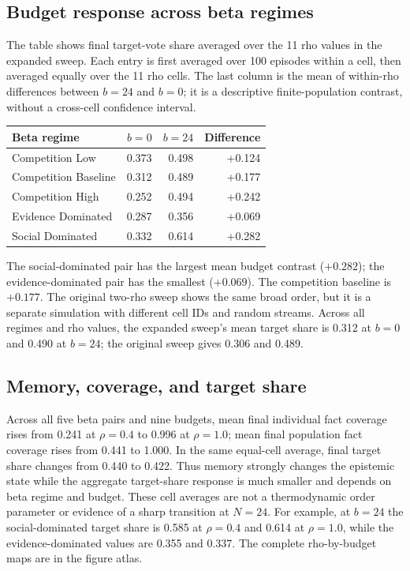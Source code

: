 \documentclass[10pt,a4paper]{article}
\begin{document}
\subsection{Budget response across beta regimes}
The table shows final target-vote share averaged over the 11 rho values in the
expanded sweep. Each entry is first averaged over 100 episodes within a
cell, then averaged equally over the 11 rho cells. The last column is the
mean of within-rho differences between $b=24$ and $b=0$; it is a descriptive
finite-population contrast, without a cross-cell confidence interval.
\begin{center}\begin{tabular}{lrrr}\toprule
Beta regime & $b=0$ & $b=24$ & Difference\\\midrule
Competition Low & 0.373 & 0.498 & +0.124\\
Competition Baseline & 0.312 & 0.489 & +0.177\\
Competition High & 0.252 & 0.494 & +0.242\\
Evidence Dominated & 0.287 & 0.356 & +0.069\\
Social Dominated & 0.332 & 0.614 & +0.282\\
\bottomrule\end{tabular}\end{center}
The social-dominated pair has the largest mean budget contrast ($+0.282$);
the evidence-dominated pair has the smallest ($+0.069$). The competition
baseline is $+0.177$. The original two-rho sweep shows the same broad order,
but it is a separate simulation with different cell IDs and random streams.
Across all regimes and rho values, the expanded sweep's mean target share is
0.312 at $b=0$ and 0.490 at $b=24$; the original sweep gives 0.306 and 0.489.

\subsection{Memory, coverage, and target share}
Across all five beta pairs and nine budgets, mean final individual fact
coverage rises from 0.241 at $\rho=0.4$ to 0.996 at $\rho=1.0$; mean final
population fact coverage rises from 0.441 to 1.000. In the same equal-cell
average, final target share changes from 0.440 to 0.422. Thus memory strongly
changes the epistemic state while the aggregate target-share response is much
smaller and depends on beta regime and budget. These cell averages are not a
thermodynamic order parameter or evidence of a sharp transition at $N=24$.
For example, at $b=24$ the social-dominated target share is 0.585 at
$\rho=0.4$ and 0.614 at $\rho=1.0$, while the evidence-dominated values are
0.355 and 0.337. The complete rho-by-budget maps are in the figure atlas.
\end{document}
